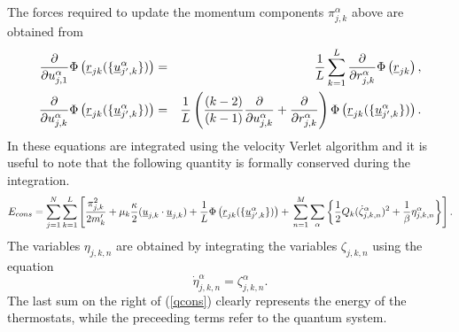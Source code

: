 The forces required to update the momentum components
${\pi}_{j,k}^{\alpha}$ above are obtained from
\begin{eqnarray}
  \frac{\partial}{\partial u_{j,1}^{\alpha}}\Phi \left (\mbox{$\underline{r}$}_{jk}(\{\mbox{$\underline{u}$}_{j',k}^{\alpha}\}) \right )&=&
  \frac{1}{L}\sum_{k=1}^{L}\frac{\partial}{\partial r_{j,k}^{\alpha}}\Phi\left (\mbox{$\underline{r}$}_{jk} \right ), \nonumber \\
  \frac{\partial}{\partial u_{j,k}^{\alpha}}\Phi\left (\mbox{$\underline{r}$}_{jk}(\{\mbox{$\underline{u}$}_{j',k}^{\alpha}\}) \right )&=&
  \frac{1}{L}\left ( \frac{(k-2)}{(k-1)}\frac{\partial}{\partial u_{j,k}^{\alpha}}+
  \frac{\partial}{\partial r_{j,k}^{\alpha}} \right ) \Phi\left (\mbox{$\underline{r}$}_{jk}(\{\mbox{$\underline{u}$}_{j',k}^{\alpha}\}) \right ).
\end{eqnarray}
In \DD{} these equations are integrated using the velocity Verlet
algorithm and it is useful to note that the following quantity is
formally conserved during the integration.
\begin{equation}
  E_{cons}=\sum_{j=1}^{N}\sum_{k=1}^{L} \left [ \frac{\pi_{j,k}^{2}}{2 m_{k}'}+
    \mu_{k} \frac{\kappa}{2} (\vek{u}_{j,k} \cdot \vek{u}_{j,k})+
    \frac{1}{L}\Phi\left (\vek{r}_{jk}(\{\vek{u}_{j',k}^{\alpha}\}) \right )+ \newline
    \sum_{n=1}^{M} \sum_{\alpha} \left \{ \frac{1}{2}Q_{k}({\dot \zeta}_{j,k,n}^{\alpha})^{2}
    +\frac{1}{\beta}\eta_{j,k,n}^{\alpha} \right \} \right ]. \label{qcons}
\end{equation}
The variables $\eta_{j,k,n}$ are obtained by integrating the variables
$\zeta_{j,k,n}$ using the equation
\begin{equation}
  {\dot \eta}_{j,k,n}^{\alpha}=\zeta_{j,k,n}^{\alpha}.
\end{equation}
The last sum on the right of (\ref{qcons}) clearly represents the
energy of the thermostats, while the preceeding terms refer to the quantum system.

